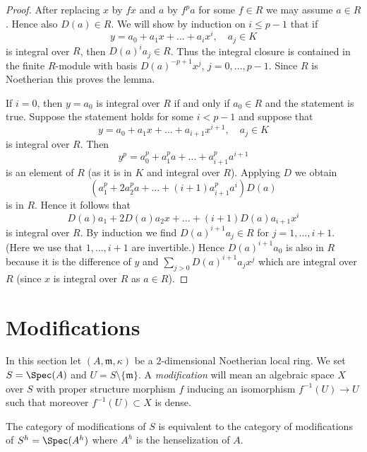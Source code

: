\begin{proof}
After replacing $x$ by $fx$ and $a$ by $f^pa$ for some $f \in R$
we may assume $a \in R$. Hence also $D(a) \in R$. We will show
by induction on $i \leq p - 1$ that if
$$
y = a_0 + a_1x + \ldots + a_i x^i,\quad a_j \in K
$$
is integral over $R$, then $D(a)^i a_j \in R$. Thus the integral
closure is contained in the finite $R$-module with basis
$D(a)^{-p + 1}x^j$, $j = 0, \ldots, p - 1$. Since $R$ is Noetherian
this proves the lemma.

\medskip\noindent
If $i = 0$, then $y = a_0$ is integral over $R$ if and only if $a_0 \in R$
and the statement is true. Suppose the statement holds for some $i < p - 1$
and suppose that
$$
y = a_0 + a_1x + \ldots + a_{i + 1} x^{i + 1},\quad a_j \in K
$$
is integral over $R$. Then
$$
y^p = a_0^p + a_1^p a + \ldots + a_{i + 1}^pa^{i + 1}
$$
is an element of $R$ (as it is in $K$ and integral over $R$). Applying
$D$ we obtain
$$
(a_1^p + 2a_2^p a + \ldots + (i + 1)a_{i + 1}^p a^i)D(a)
$$
is in $R$. Hence it follows that
$$
D(a)a_1 + 2D(a) a_2 x + \ldots + (i + 1)D(a) a_{i + 1} x^i
$$
is integral over $R$. By induction we find $D(a)^{i + 1}a_j \in R$
for $j = 1, \ldots, i + 1$. (Here we use that $1, \ldots, i + 1$
are invertible.) Hence $D(a)^{i + 1}a_0$ is also in $R$ because it
is the difference of $y$ and $\sum_{j > 0} D(a)^{i + 1}a_jx^j$ which
are integral over $R$ (since $x$ is integral over $R$ as $a \in R$).
\end{proof}







\section{Modifications}
\label{section-modifications}

\noindent
In this section let $(A, \mathfrak m, \kappa)$ be a $2$-dimensional
Noetherian local ring. We set $S = \Spec(A)$ and
$U = S \setminus \{\mathfrak m\}$. A {\it modification}
will mean an algebraic space $X$ over $S$ with proper structure morphism
$f$ inducing an isomorphism $f^{-1}(U) \to U$ such that moreover
$f^{-1}(U) \subset X$ is dense.

\begin{lemma}
\label{lemma-henselian}
The category of modifications of $S$ is equivalent to the category
of modifications of $S^h = \Spec(A^h)$ where $A^h$ is the henselization
of $A$.
\end{lemma}

